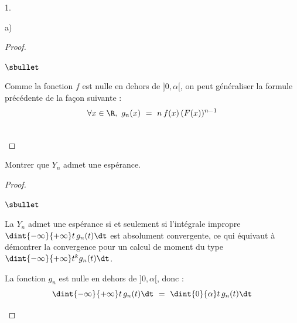 \documentclass[11pt]{article}%
\begin{document}
\begin{noliste}{1.}
\begin{noliste}{a)}
\begin{proof}
\begin{noliste}{$\sbullet$}
	\conc{Une densité de $Y_n$ est donc $g_n : x \mapsto \left\{
	\begin{array}{cR{2cm}}
	  n \, f(x) \, (F(x))^{n-1} & si $x \in \ ]0,\alpha[$
	  \nl
	  0 & sinon
	\end{array}
	\right.$}
      \end{noliste}
      
      \begin{remark}
        Comme la fonction $f$ est nulle en dehors de $]0,\alpha[$,
        on peut généraliser la formule précédente de la façon 
        suivante :~\\[-.4cm]
        \[
          \forall x \in \R, \ g_n(x) \ = \ n \, f(x) \, (F(x))^{n-1}
        \]
      \end{remark}~\\[-1.4cm]
    \end{proof}

    
    \item Montrer que $Y_n$ admet une espérance.
    
    \begin{proof}~
      \begin{noliste}{$\sbullet$}
	\item La \var $Y_n$ admet une espérance si et seulement si 
	l'intégrale impropre $\dint{-\infty}{+\infty} t \, g_n(t) \dt$
	est absolument convergente, ce qui équivaut à démontrer la 
	convergence pour un calcul de moment du type $\dint{-\infty}
	{+\infty} t^k g_n(t) \dt$.
	
	\item La fonction $g_n$ est nulle en dehors de $]0,\alpha[$,
	donc :
	\[
	  \dint{-\infty}{+\infty} t \, g_n(t) \dt \ = \ 
	  \dint{0}{\alpha} t \, g_n(t) \dt
	\]
	
	
	\newpage
	

\end{noliste}
\end{proof}
\end{noliste}
\end{noliste}
\end{document}

